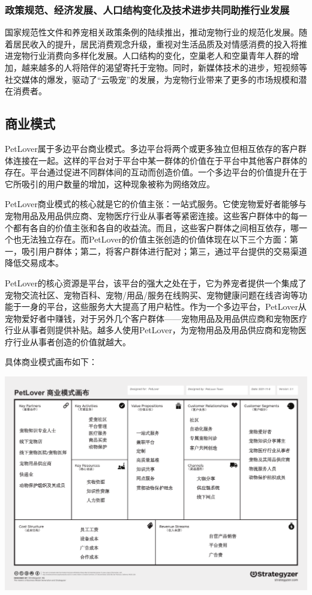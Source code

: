 \documentclass[a4paper]{ctexart}
\begin{document}
\subsubsection{政策规范、经济发展、人口结构变化及技术进步共同助推行业发展}
国家规范性文件和养宠相关政策条例的陆续推出，推动宠物行业的规范化发展。随着居民收入的提升，居民消费观念升级，重视对生活品质及对情感消费的投入将推进宠物行业消费向多样化发展。人口结构的变化，空巢老人和空巢青年人群的增加，越来越多的人将陪伴的渴望寄托于宠物。同时，新媒体技术的进步，短视频等社交媒体的爆发，驱动了“云吸宠”的发展，为宠物行业带来了更多的市场规模和潜在消费者。

\subsection{商业模式}

PetLover属于多边平台商业模式。多边平台将两个或更多独立但相互依存的客户群体连接在一起。这样的平台对于平台中某一群体的价值在于平台中其他客户群体的存在。平台通过促进不同群体间的互动而创造价值。一个多边平台的价值提升在于它所吸引的用户数量的增加，这种现象被称为网络效应。

PetLover商业模式的核心就是它的价值主张：一站式服务。它使宠物爱好者能够与宠物用品及用品供应商、宠物医疗行业从事者等紧密连接。这些客户群体中的每一个都有各自的价值主张和各自的收益流。而且，这些客户群体之间相互依存，哪一个也无法独立存在。而PetLover的价值主张创造的价值体现在以下三个方面：第一，吸引用户群体；第二，将客户群体进行配对；第三，通过平台提供的交易渠道降低交易成本。

PetLover的核心资源是平台，该平台的强大之处在于，它为养宠者提供一个集成了宠物交流社区、宠物百科、宠物/用品/服务在线购买、宠物健康问题在线咨询等功能于一身的平台，这些服务大大提高了用户粘性。作为一个多边平台，PetLover从宠物爱好者中赚钱，对于另外几个客户群体——宠物用品及用品供应商和宠物医疗行业从事者则提供补贴。越多人使用PetLover，为宠物用品及用品供应商和宠物医疗行业从事者创造的价值就越大。

具体商业模式画布如下：

\begin{center}
  \includegraphics[scale=0.4]{改动后画布.pdf}
\end{center}
\end{document}
